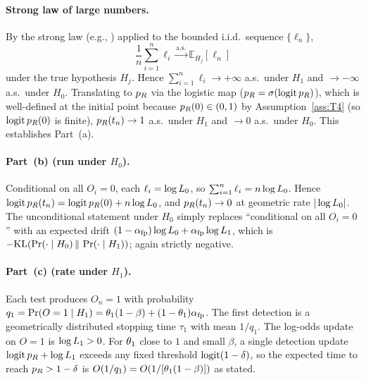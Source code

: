 \paragraph{Strong law of large numbers.}
By the strong law (e.g.,
\citep[Ch.~6]{cover2006elements}) applied to the bounded
i.i.d.\ sequence $\{\ell_n\}$,
$$
\frac{1}{n} \sum_{i=1}^n \ell_i
   \xrightarrow{\mathrm{a.s.}} \mathbb{E}_{H_j}[\ell_n]
$$
under the true hypothesis $H_j$.  Hence
$\sum_{i=1}^n \ell_i \to +\infty$ a.s.\ under $H_1$ and
$\to -\infty$ a.s.\ under $H_0$.  Translating to $p_R$ via the
logistic map ($p_R = \sigma(\operatorname{logit} p_R)$), which is
well-defined at the initial point because
$p_R(0) \in (0, 1)$ by Assumption~\ref{ass:T4} (so
$\operatorname{logit} p_R(0)$ is finite),
$p_R(t_n) \to 1$ a.s.\ under $H_1$ and $\to 0$ a.s.\ under
$H_0$.  This establishes Part~(a).

\paragraph{Part~(b) (run under $H_0$).}
Conditional on all $O_i = 0$, each $\ell_i = \log L_0$, so
$\sum_{i=1}^n \ell_i = n \log L_0$.  Hence
$\operatorname{logit} p_R(t_n) = \operatorname{logit} p_R(0) + n \log L_0$, and
$p_R(t_n) \to 0$ at geometric rate $|\log L_0|$.  The
unconditional statement under $H_0$ simply replaces
``conditional on all $O_i = 0$'' with an expected drift
$(1 - \alpha_{\mathrm{fp}}) \log L_0 + \alpha_{\mathrm{fp}} \log L_1$, which is
$-\mathrm{KL}(\Pr(\cdot \mid H_0) \,\|\, \Pr(\cdot \mid H_1))$; again
strictly negative.

\paragraph{Part~(c) (rate under $H_1$).}
Each test produces $O_n = 1$ with probability
$q_1 = \Pr(O = 1 \mid H_1) = \theta_1(1 - \beta) + (1 -
\theta_1)\alpha_{\mathrm{fp}}$.  The first detection is a geometrically
distributed stopping time $\tau_1$ with mean $1/q_1$.  The
log-odds update on $O = 1$ is $\log L_1 > 0$.  For
$\theta_1$ close to $1$ and small $\beta$, a single detection
update $\operatorname{logit} p_R + \log L_1$ exceeds any fixed threshold
$\operatorname{logit}(1 - \delta)$, so the expected time to reach
$p_R > 1 - \delta$ is $O(1/q_1) = O(1/[\theta_1(1 - \beta)])$
as stated.

